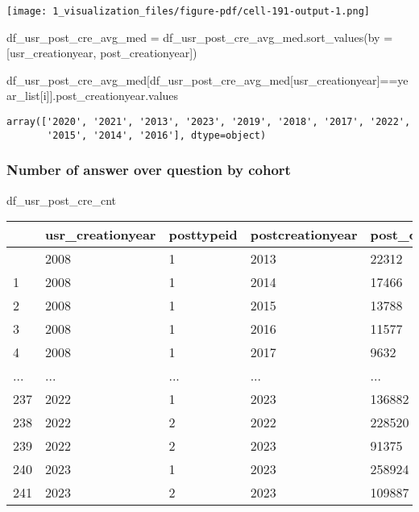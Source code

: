 \documentclass[
  letterpaper,
  DIV=11,
  numbers=noendperiod]{scrartcl}
\newenvironment{Shaded}{\begin{snugshade}}{\end{snugshade}}
\newcommand{\NormalTok}[1]{\textcolor[rgb]{0.00,0.23,0.31}{#1}}
\newcommand{\OperatorTok}[1]{\textcolor[rgb]{0.37,0.37,0.37}{#1}}
\newcommand{\StringTok}[1]{\textcolor[rgb]{0.13,0.47,0.30}{#1}}
\begin{document}
\texttt{[image: 1\_visualization\_files/figure-pdf/cell-191-output-1.png]}

\begin{Shaded}
\begin{Highlighting}[]
\NormalTok{df\_usr\_post\_cre\_avg\_med }\OperatorTok{=}\NormalTok{ df\_usr\_post\_cre\_avg\_med.sort\_values(by }\OperatorTok{=}\NormalTok{ [}\StringTok{\textquotesingle{}usr\_creationyear\textquotesingle{}}\NormalTok{, }\StringTok{\textquotesingle{}post\_creationyear\textquotesingle{}}\NormalTok{])}
\end{Highlighting}
\end{Shaded}

\begin{Shaded}
\begin{Highlighting}[]
\NormalTok{df\_usr\_post\_cre\_avg\_med[df\_usr\_post\_cre\_avg\_med[}\StringTok{\textquotesingle{}usr\_creationyear\textquotesingle{}}\NormalTok{]}\OperatorTok{==}\NormalTok{year\_list[i]].post\_creationyear.values}
\end{Highlighting}
\end{Shaded}

\begin{verbatim}
array(['2020', '2021', '2013', '2023', '2019', '2018', '2017', '2022',
       '2015', '2014', '2016'], dtype=object)
\end{verbatim}

\subsubsection{Number of answer over question by
cohort}\label{number-of-answer-over-question-by-cohort}

\begin{Shaded}
\begin{Highlighting}[]
\NormalTok{df\_usr\_post\_cre\_cnt}
\end{Highlighting}
\end{Shaded}

\begin{longtable}[]{@{}lllll@{}}
\toprule\noalign{}
& usr\_creationyear & posttypeid & postcreationyear & post\_cnt \\
\midrule\noalign{}
\endhead
\bottomrule\noalign{}
\endlastfoot
0 & 2008 & 1 & 2013 & 22312 \\
1 & 2008 & 1 & 2014 & 17466 \\
2 & 2008 & 1 & 2015 & 13788 \\
3 & 2008 & 1 & 2016 & 11577 \\
4 & 2008 & 1 & 2017 & 9632 \\
... & ... & ... & ... & ... \\
237 & 2022 & 1 & 2023 & 136882 \\
238 & 2022 & 2 & 2022 & 228520 \\
239 & 2022 & 2 & 2023 & 91375 \\
240 & 2023 & 1 & 2023 & 258924 \\
241 & 2023 & 2 & 2023 & 109887 \\
\end{longtable}
\end{document}
